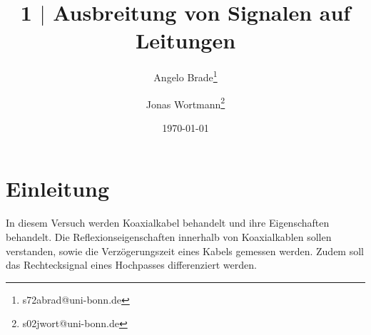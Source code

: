 \documentclass[a4paper,10pt]{article}
\numberwithin{equation}{section}
\begin{document}

\begin{titlepage}
        \title{1 $|$ Ausbreitung von Signalen auf Leitungen}
        \author[1]{Angelo Brade\thanks{s72abrad@uni-bonn.de}}
        \author[1]{Jonas Wortmann\thanks{s02jwort@uni-bonn.de}}
        \date{\today}
\end{titlepage}

\maketitle
{}


\newpage


\fancyhead[R]{\thepage}
\fancyfoot[C]{}

\tableofcontents


\newpage


\fancyhead[L]{\leftmark}

\section{Einleitung}
In diesem Versuch werden Koaxialkabel behandelt und ihre Eigenschaften behandelt.
Die Reflexionseigenschaften innerhalb von Koaxialkablen sollen verstanden, sowie die Verzögerungszeit eines Kabels gemessen werden.
Zudem soll das Rechtecksignal eines Hochpasses differenziert werden.

\newpage
\end{document}
